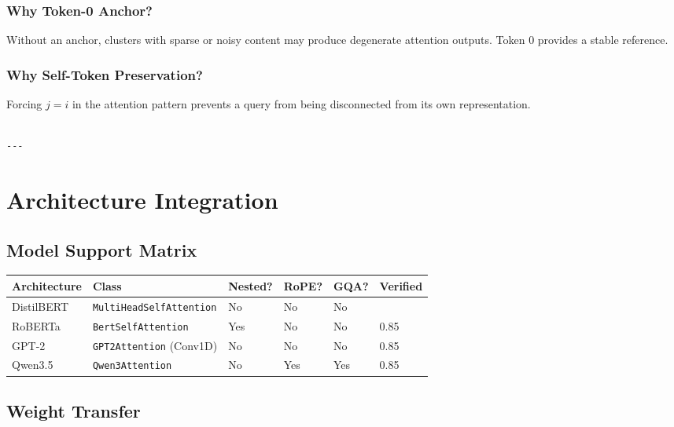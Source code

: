 \subsubsection{Why Token-0 Anchor?}

Without an anchor, clusters with sparse or noisy content may produce 
degenerate attention outputs. Token 0 provides a stable reference.

\subsubsection{Why Self-Token Preservation?}

Forcing $j = i$ in the attention pattern prevents a query from being 
disconnected from its own representation.
\begin{lstlisting}

---
\end{lstlisting}


\section{Architecture Integration}

\subsection{Model Support Matrix}

\begin{table}[H]
\centering
\small
\begin{tabular}{llllll}
\toprule
\textbf{Architecture} & \textbf{Class} & \textbf{Nested?} & \textbf{RoPE?} & \textbf{GQA?} & \textbf{Verified} \\
\midrule
DistilBERT & \texttt{MultiHeadSelfAttention} & No & No & No &  \\
RoBERTa & \texttt{BertSelfAttention} & Yes & No & No & 0.85 \\
GPT-2 & \texttt{GPT2Attention} (Conv1D) & No & No & No & 0.85 \\
Qwen3.5 & \texttt{Qwen3Attention} & No & Yes & Yes & 0.85 \\
\bottomrule
\end{tabular}
\end{table}

\subsection{Weight Transfer}

